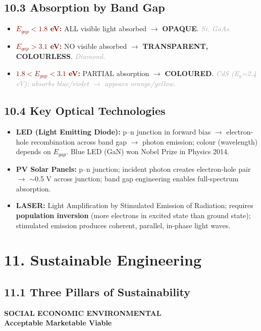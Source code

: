 \documentclass[11pt,a4paper]{article}
\newcommand{\mysec}[1]{\section*{#1}}
\newcommand{\mysubsec}[1]{\subsection*{#1}}
\newcommand{\CRIT}[1]{\textcolor{DarkRed}{\textbf{#1}}}
\newcommand{\KEY}[1]{\textcolor{SecondaryDark}{\textbf{#1}}}
\newcommand{\EXA}[1]{\textcolor{DarkGray}{\textit{#1}}}
\begin{document}
\mysubsec{10.3 Absorption by Band Gap}
\begin{itemize}[leftmargin=*,nosep]
    \item \CRIT{$E_{gap} < 1.8$ eV:} ALL visible light absorbed $\to$ \textbf{OPAQUE}. \EXA{Si, GaAs.}
    \item \CRIT{$E_{gap} > 3.1$ eV:} NO visible absorbed $\to$ \textbf{TRANSPARENT, COLOURLESS}. \EXA{Diamond.}
    \item \CRIT{$1.8 < E_{gap} < 3.1$ eV:} PARTIAL absorption $\to$ \textbf{COLOURED}. \EXA{CdS (E$_g$=2.4 eV): absorbs blue/violet $\to$ appears orange/yellow.}
\end{itemize}

\mysubsec{10.4 Key Optical Technologies}
\begin{itemize}[leftmargin=*,nosep]
    \item \KEY{LED (Light Emitting Diode):} p--n junction in forward bias $\to$ electron-hole recombination across band gap $\to$ photon emission; colour (wavelength) depends on $E_{gap}$. Blue LED (GaN) won Nobel Prize in Physics 2014.
    \item \KEY{PV Solar Panels:} p--n junction; incident photon creates electron-hole pair $\to$ $\sim$0.5 V across junction; band gap engineering enables full-spectrum absorption.
    \item \KEY{LASER:} Light Amplification by Stimulated Emission of Radiation; requires \textbf{population inversion} (more electrons in excited state than ground state); stimulated emission produces coherent, parallel, in-phase light waves.
\end{itemize}

\newpage
\mysec{11. Sustainable Engineering}

\mysubsec{11.1 Three Pillars of Sustainability}
\begin{center}
\begin{tcolorbox}[
  enhanced,
  sharp corners,
  boxrule=1pt,
  colback=DarkOrange!3!white,
  colframe=DarkOrange!60,
  width=0.92\linewidth,
  before skip=8pt, after skip=8pt,
]
  \centering\large\bfseries
  SOCIAL \hspace{2cm} ECONOMIC \hspace{2cm} ENVIRONMENTAL\\[4pt]
  \normalsize Acceptable \hspace{1.8cm} Marketable \hspace{1.8cm} Viable
\end{tcolorbox}
\end{center}
\end{document}
